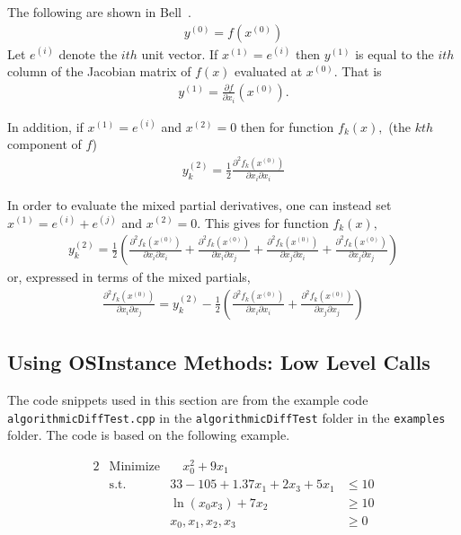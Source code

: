\documentclass[11pt]{article}
\newcommand{\D}[2]{ \frac{\partial #1}{\partial #2} }
\newcommand{\DD}[3]{ \frac{\partial^2 #1}{\partial #2 \partial #3} }
\renewcommand{\_}{{\char"5F}}
\renewcommand{\{}{{\char"7B}}
\renewcommand{\}}{{\char"7D}}
\renewcommand{\^}{{\char"0D}}
\renewcommand{\'}{{\char"0D}}
\begin{document}
\begin{enumerate}[Step 1:]
The following are shown in Bell~\cite{bell2007}.
\begin{eqnarray}
y^{(0)} = f(x^{(0)}) \label{eq:forward0Result}
\end{eqnarray}
Let $e^{(i)}$ denote the $ith$ unit vector.  If $x^{(1)} = e^{(i)}$ then $y^{(1)}$ is equal to the $ith$ column of the Jacobian matrix of $f(x)$ evaluated at $x^{(0)}.$ That is
\begin{eqnarray}
y^{(1)} = \D{f}{x_{i}}(x^{(0)}).  \label{eq:forward1Result}
\end{eqnarray}

In addition, if $x^{(1)} = e^{(i)}$ and $x^{(2)} = 0$ then for function $f_{k}(x),$ (the $kth$ component of $f$)
\begin{eqnarray}
y^{(2)}_{k} =  \frac{1}{2} \DD{f_{k}(x^{(0)})}{x_{i}}{x_{i}}  \label{eq:forward2Resulta}
\end{eqnarray}

In order to evaluate the mixed partial derivatives, one can instead set $x^{(1)} = e^{(i)} + e^{(j)}$ and $x^{(2)} = 0.$    This gives for function $f_{k}(x),$
\begin{eqnarray}
y^{(2)}_{k} =  \frac{1}{2} \left( \DD{f_{k}(x^{(0)})}{x_{i}}{x_{i}}  +   \DD{f_{k}(x^{(0)})}{x_{i}}{x_{j}} +  \DD{f_{k}(x^{(0)})}{x_{j}}{x_{i}} +  \DD{f_{k}(x^{(0)})}{x_{j}}{x_{j}}  \right) \label{eq:forward2Resultb}
\end{eqnarray}
or, expressed in terms of the mixed partials,
\begin{eqnarray}
  \DD{f_{k}(x^{(0)})}{x_{i}}{x_{j}}  = y_{k}^{(2)}  -  \frac{1}{2} \left( \DD{f_{k}(x^{(0)})}{x_{i}}{x_{i}}  +  \DD{f_{k}(x^{(0)})}{x_{j}}{x_{j}}  \right) \label{eq:forward2Resultc}
\end{eqnarray}




\subsection{Using OSInstance Methods: Low Level Calls}\label{section:lowlevelADcalls}

  The code snippets used in this section  are from the example code {\tt algorithmicDiffTest.cpp} in the 
{\tt algorithmicDiffTest} folder in the {\tt examples} folder.  The  code is based on the following example.

\begin{alignat}{2}
& \mbox{Minimize} & \quad  x_{0}^{2} + 9x_{1} \label{eq:adobj}\\
& \mbox{s.t.} & 33 - 105 + 1.37 x_{1} + 2x_{3} + 5 x_{1} &\le 10  \label{eq:adeq0}\\
& & \ln(x_{0} x_{3}) + 7x_{2} &\ge 10 \label{eq:adeq1} \\
& & x_{0}, x_{1}, x_{2}, x_{3} &\ge 0 \label{eq:adeq2}
\end{alignat}


\end{enumerate}
\end{document}
